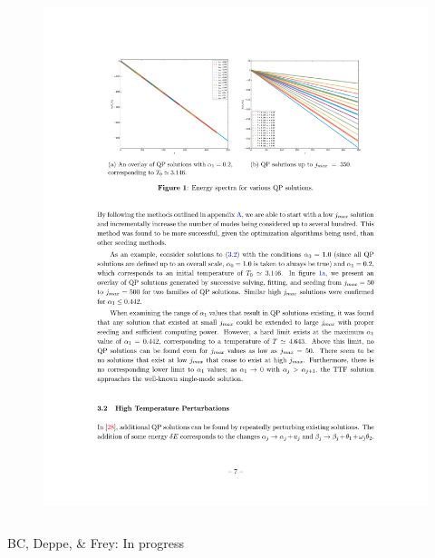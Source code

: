 \documentclass[mathserif,10pt]{beamer}
\newcommand{\scr}{\scriptsize}
\begin{document}
{\begin{columns}
\begin{figure}
  \includegraphics[scale=0.75]{families}
  \end{figure}
  \end{columns}
  \begin{center}
  {\scr BC, Deppe, \& Frey: In progress}
  \end{center}
  
  \vfill
}

\end{document}
